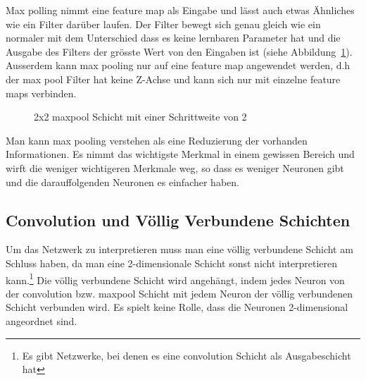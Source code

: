\documentclass[12pt,a4paper]{report}
\begin{document}
Max polling nimmt eine feature map als Eingabe und lässt auch etwas Ähnliches wie ein Filter darüber laufen.
Der Filter bewegt sich genau gleich wie ein normaler mit dem Unterschied dass es keine lernbaren Parameter hat und
die Ausgabe des Filters der grösste Wert von den Eingaben ist (siehe Abbildung~\ref{fig:pool1}).
Ausserdem kann max pooling nur auf eine feature map angewendet werden,
d.h der max pool Filter hat keine Z-Achse und kann sich nur mit einzelne feature maps verbinden\cite{conv}.
\begin{figure}[h]
    \centering
    \caption{2x2 maxpool Schicht mit einer Schrittweite von 2}
    \label{fig:pool1}
\end{figure}
Man kann max pooling verstehen als eine Reduzierung der vorhanden Informationen.
Es nimmt das wichtigste Merkmal in einem gewissen Bereich und wirft die weniger wichtigeren Merkmale weg,
so dass es weniger Neuronen gibt und die darauffolgenden Neuronen es einfacher haben.

\subsection{Convolution und Völlig Verbundene Schichten}
Um das Netzwerk zu interpretieren muss man eine völlig verbundene Schicht am Schluss haben,
da man eine 2-dimensionale Schicht sonst nicht interpretieren kann.\footnote{Es gibt Netzwerke, bei denen es eine convolution Schicht als Ausgabeschicht hat\cite{fullconvolution}}
Die völlig verbundene Schicht wird angehängt, indem jedes Neuron von der convolution bzw. maxpool Schicht mit jedem Neuron der völlig verbundenen Schicht verbunden wird.
Es spielt keine Rolle, dass die Neuronen 2-dimensional angeordnet sind.
\end{document}
